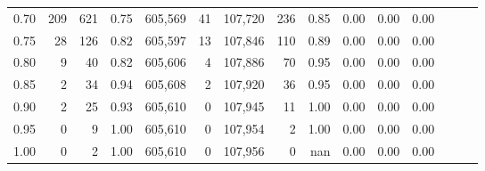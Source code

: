 \begin{tabular}{rrrrrrrrrrrrrrr}
0.70 &      209 &     621 &  0.75 &  605,569 &       41 &  107,720 &      236 &  0.85 &  0.00 &  0.00 &      0.00 \\
0.75 &       28 &     126 &  0.82 &  605,597 &       13 &  107,846 &      110 &  0.89 &  0.00 &  0.00 &      0.00 \\
0.80 &        9 &      40 &  0.82 &  605,606 &        4 &  107,886 &       70 &  0.95 &  0.00 &  0.00 &      0.00 \\
0.85 &        2 &      34 &  0.94 &  605,608 &        2 &  107,920 &       36 &  0.95 &  0.00 &  0.00 &      0.00 \\
0.90 &        2 &      25 &  0.93 &  605,610 &        0 &  107,945 &       11 &  1.00 &  0.00 &  0.00 &      0.00 \\
0.95 &        0 &       9 &  1.00 &  605,610 &        0 &  107,954 &        2 &  1.00 &  0.00 &  0.00 &      0.00 \\
1.00 &        0 &       2 &  1.00 &  605,610 &        0 &  107,956 &        0 &   nan &  0.00 &  0.00 &      0.00 \\
\bottomrule
\end{tabular}
